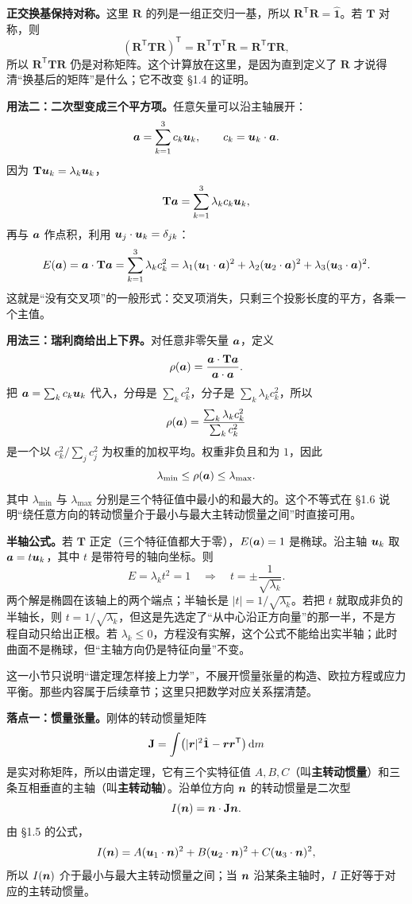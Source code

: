 \documentclass[11pt]{ctexart}
\newcommand{\ten}[1]{\mathbf{#1}}
\newcommand{\unitd}{\hat{\ten{1}}}
\let\origsubhdr\subhdr
\renewcommand{\subhdr}[1]{\par\needspace{3\baselineskip}\origsubhdr{#1}}
\begin{document}
\textbf{正交换基保持对称。}这里 $\ten R$ 的列是一组正交归一基，所以 $\ten R^{\mathsf T}\ten R=\unitd$。若 $\ten T$ 对称，则
\[
(\ten R^{\mathsf T}\ten T\ten R)^{\mathsf T}
=\ten R^{\mathsf T}\ten T^{\mathsf T}\ten R
=\ten R^{\mathsf T}\ten T\ten R,
\]
所以 $\ten R^{\mathsf T}\ten T\ten R$ 仍是对称矩阵。这个计算放在这里，是因为直到定义了 $\ten R$ 才说得清“换基后的矩阵”是什么；它不改变 §1.4 的证明。

\textbf{用法二：二次型变成三个平方项。}任意矢量可以沿主轴展开：
\[
\boldsymbol{a}=\sum_{k=1}^{3}c_k\boldsymbol{u}_k,
\qquad
c_k=\boldsymbol{u}_k\cdot\boldsymbol{a} .
\]
因为 $\ten T\vect u_k=\lambda_k\vect u_k$，
\[
\ten T\vect a=\sum_{k=1}^{3}\lambda_k c_k\vect u_k,
\]
再与 $\boldsymbol{a}$ 作点积，利用 $\boldsymbol{u}_j\cdot\boldsymbol{u}_k=\delta_{jk}$：
\[
E(\vect a)=\vect a\cdot\ten T\vect a
=\sum_{k=1}^{3}\lambda_k c_k^2
=\lambda_1(\vect u_1\cdot\vect a)^2
+\lambda_2(\vect u_2\cdot\vect a)^2
+\lambda_3(\vect u_3\cdot\vect a)^2 .
\]
这就是“没有交叉项”的一般形式：交叉项消失，只剩三个投影长度的平方，各乘一个主值。

\textbf{用法三：瑞利商给出上下界。}对任意非零矢量 $\boldsymbol{a}$，定义
\[
\rho(\vect a)=\frac{\vect a\cdot\ten T\vect a}{\vect a\cdot\vect a}.
\]
把 $\boldsymbol{a}=\sum_k c_k\boldsymbol{u}_k$ 代入，分母是 $\sum_k c_k^2$，分子是 $\sum_k\lambda_k c_k^2$，所以
\[
\rho(\boldsymbol{a})
=\frac{\sum_k\lambda_k c_k^2}{\sum_k c_k^2}
\]
是一个以 $c_k^2/\sum_j c_j^2$ 为权重的加权平均。权重非负且和为 $1$，因此
\[
\lambda_{\min}\le\rho(\boldsymbol{a})\le\lambda_{\max}.
\]
其中 $\lambda_{\min}$ 与 $\lambda_{\max}$ 分别是三个特征值中最小的和最大的。这个不等式在 §1.6 说明“绕任意方向的转动惯量介于最小与最大主转动惯量之间”时直接可用。

\textbf{半轴公式。}若 $\ten T$ 正定（三个特征值都大于零），$E(\boldsymbol{a})=1$ 是椭球。沿主轴 $\boldsymbol{u}_k$ 取 $\boldsymbol{a}=t\boldsymbol{u}_k$，其中 $t$ 是带符号的轴向坐标。则
\[
E=\lambda_k t^2=1
\quad\Longrightarrow\quad
t=\pm\frac{1}{\sqrt{\lambda_k}} .
\]
两个解是椭圆在该轴上的两个端点；半轴长是 $|t|=1/\sqrt{\lambda_k}$。若把 $t$ 就取成非负的半轴长，则 $t=1/\sqrt{\lambda_k}$，但这是先选定了“从中心沿正方向量”的那一半，不是方程自动只给出正根。若 $\lambda_k\le0$，方程没有实解，这个公式不能给出实半轴；此时曲面不是椭球，但“主轴方向仍是特征向量”不变。


这一小节只说明“谱定理怎样接上力学”，不展开惯量张量的构造、欧拉方程或应力平衡。那些内容属于后续章节；这里只把数学对应关系摆清楚。

\textbf{落点一：惯量张量。}刚体的转动惯量矩阵
\[
\ten J=\int\bigl(|\vect r|^2\unitd-\vect r\vect r^{\mathsf T}\bigr)\dd m
\]
是实对称矩阵，所以由谱定理，它有三个实特征值 $A,B,C$（叫\textbf{主转动惯量}）和三条互相垂直的主轴（叫\textbf{主转动轴}）。沿单位方向 $\boldsymbol{n}$ 的转动惯量是二次型
\[
I(\vect n)=\vect n\cdot\ten J\vect n .
\]
由 §1.5 的公式，
\[
I(\boldsymbol{n})=A(\boldsymbol{u}_1\cdot\boldsymbol{n})^2
+B(\boldsymbol{u}_2\cdot\boldsymbol{n})^2
+C(\boldsymbol{u}_3\cdot\boldsymbol{n})^2,
\]
所以 $I(\boldsymbol{n})$ 介于最小与最大主转动惯量之间；当 $\boldsymbol{n}$ 沿某条主轴时，$I$ 正好等于对应的主转动惯量。
\end{document}
